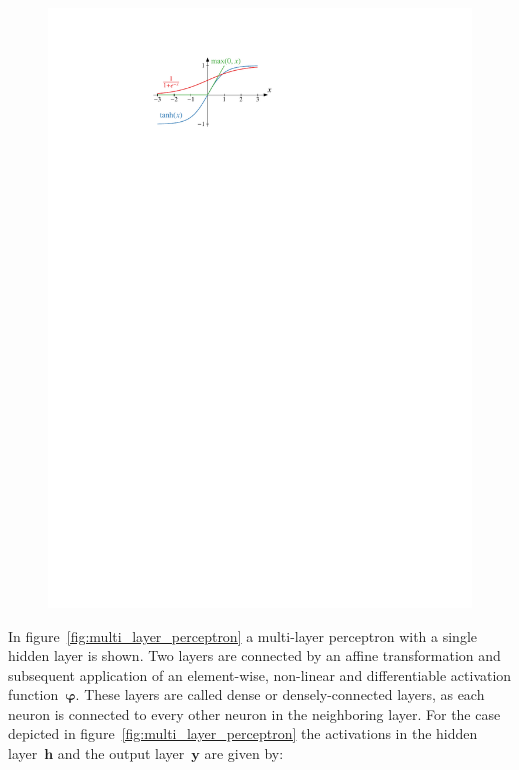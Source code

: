 \begin{figure}[htb]
\begin{minipage}[t]{0.4\textwidth}
    \includegraphics{./figures/theory/activation_functions.pdf}
    \label{fig:activation_functions}
  \end{minipage}
\end{figure}
In figure~\ref{fig:multi_layer_perceptron} a multi-layer perceptron with a
single hidden layer is shown. Two layers are connected by an affine
transformation and subsequent application of an element-wise, non-linear and
differentiable activation function~$\bm{\varphi}$. These layers are called dense
or densely-connected layers, as each neuron is connected to every other neuron
in the neighboring layer. For the case depicted in
figure~\ref{fig:multi_layer_perceptron} the activations in the hidden
layer~$\mathbf{h}$ and the output layer~$\mathbf{y}$ are given by:
